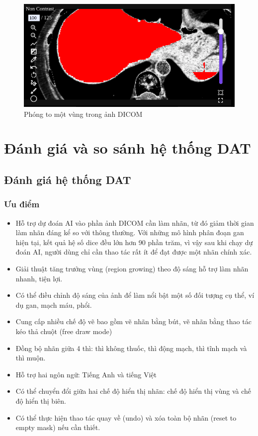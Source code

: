 \begin{figure}[H]
    \centering
    \includegraphics[width=\textwidth]{images/chapter-07-images/user-zoom-in.png}
    \caption{Phóng to một vùng trong ảnh DICOM}
\end{figure}


\section{Đánh giá và so sánh hệ thống DAT}
\subsection{Đánh giá hệ thống DAT}
\subsubsection{Ưu điểm}
\begin{itemize}
    \item Hỗ  trợ dự đoán AI vào phần ảnh DICOM cần làm nhãn, từ đó giảm thời gian làm nhãn đáng kể so với thông thường. Với những mô hình phân đoạn gan hiện tại, kết quả hệ số dice đều lớn hơn 90 phần trăm, vì vậy sau khi chạy dự đoán AI, người dùng chỉ cần thao tác rất ít để đạt được một nhãn chính xác.
    \item Giải thuật tăng trưởng vùng (region growing) theo độ sáng hỗ trợ làm nhãn nhanh, tiện lợi. 
    \item Có thể điều chỉnh độ sáng của ảnh để làm nổi bật  một số đối tượng cụ thể, ví dụ gan, mạch máu, phổi. 
    \item Cung cấp nhiều chế độ vẽ bao gồm vẽ nhãn bằng bút, vẽ nhãn bằng thao tác kéo thả chuột (free draw mode)
    \item Đồng bộ nhãn giữa 4 thì: thì không thuốc, thì động mạch, thì tĩnh mạch và thì muộn. 
    \item Hỗ trợ hai ngôn ngữ:  Tiếng Anh và tiếng Việt
    \item Có thể chuyển đổi giữa hai chế độ hiển thị nhãn: chế độ hiển thị vùng và chế độ hiển thị biên. 
    \item Có thể thực hiện thao tác quay về (undo) và xóa toàn bộ nhãn (reset to empty mask) nếu cần thiết. 
\end{itemize}


